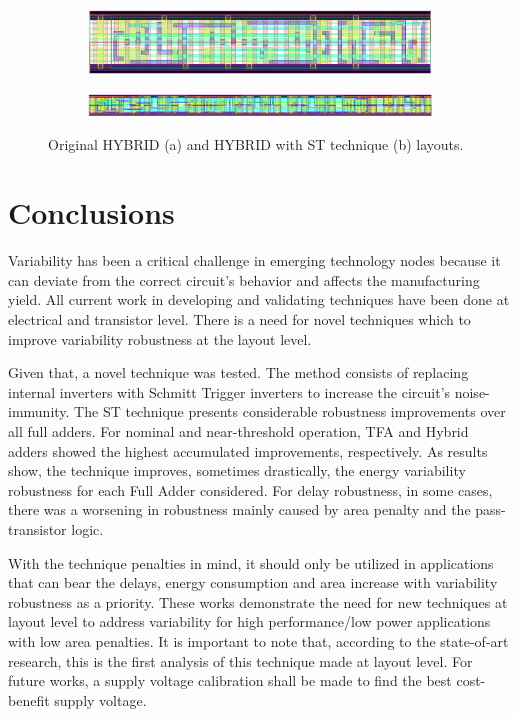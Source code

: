 \documentclass[ecp,tc, english]{iiufrgs}
\begin{document}
\begin{figure}[H]
\centering
\begin{subfigure}[b]{\textwidth}
   \includegraphics[width=1\linewidth]{HYBRID.png}
   \caption{}
   \label{fig:Ng1} 
\end{subfigure}

\begin{subfigure}[b]{\textwidth}
   \includegraphics[width=1\linewidth]{HYBRIDST.png}
   \caption{}
   \label{fig:Ng2}
\end{subfigure}

\caption{Original HYBRID (a) and HYBRID with ST technique (b) layouts.}
\label{hybrid}
\end{figure}

\chapter{Conclusions}

Variability has been a critical challenge in emerging technology nodes because it can deviate from the correct circuit's behavior and affects the manufacturing yield. All current work in developing and validating techniques have been done at electrical and transistor level. There is a need for novel techniques which to improve variability robustness at the layout level.

Given that, a novel technique was tested. The method consists of replacing internal inverters with Schmitt Trigger inverters to increase the circuit’s noise-immunity. The ST technique presents considerable robustness improvements over all full adders. For nominal and near-threshold operation, TFA and Hybrid adders showed the highest accumulated improvements, respectively. As results show, the technique improves, sometimes drastically, the energy variability robustness for each Full Adder considered. For delay robustness, in some cases, there was a worsening in robustness mainly caused by area penalty and the pass-transistor logic. 

With the technique penalties in mind, it should only be utilized in applications that can bear the delays, energy consumption and area increase with variability robustness as a priority. These works demonstrate the need for new techniques at layout level to address variability for high performance/low power applications with low area penalties. It is important to note that, according to the state-of-art research, this is the first analysis of this technique made at layout level. For future works, a supply voltage calibration shall be made to find the best cost-benefit supply voltage.




\end{document}
